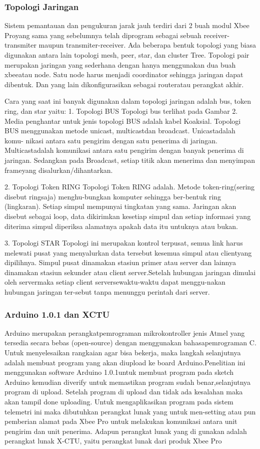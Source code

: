 \subsubsection{Topologi Jaringan}
Sistem pemantauan dan pengukuran jarak jauh terdiri dari 2 buah modul 
Xbee Proyang sama yang sebelumnya telah diprogram sebagai sebuah receiver-transmiter maupun transmiter-receiver. Ada beberapa bentuk topologi yang biasa digunakan antara lain topologi mesh, peer, star, dan cluster Tree.
Topologi pair merupakan jaringan yang sederhana dengan hanya menggunakan dua buah xbeeatau node. Satu node harus menjadi coordinator sehingga jaringan dapat dibentuk. Dan yang lain dikonfigurasikan sebagai routeratau perangkat akhir.

Cara yang saat ini banyak digunakan  dalam topologi jaringan adalah bus, token ring, dan star yaitu:
1. Topologi BUS 
Topologi bus terlihat pada Gambar 2. Media penghantar untuk jenis topologi BUS adalah kabel Koaksial. Topologi BUS menggunakan metode unicast, multicastdan broadcast. Unicastadalah komu- nikasi antara satu pengirim 
dengan satu penerima di jaringan. Multicastadalah komunikasi antara satu pengirim dengan banyak penerima di jaringan. Sedangkan pada Broadcast, setiap titik akan menerima dan menyimpan frameyang disalurkan/dihantarkan.

2. Topologi Token RING 
Topologi Token RING adalah. Metode token-ring(sering disebut ringsaja) menghu-bungkan komputer sehingga ber-bentuk ring (lingkaran). Setiap 
simpul mempunyai tingkatan yang sama. Jaringan akan disebut sebagai loop, data dikirimkan kesetiap simpul dan setiap informasi yang diterima simpul diperiksa alamatnya apakah data itu untuknya atau bukan.

3. Topologi STAR 
Topologi ini merupakan kontrol terpusat, semua link harus melewati pusat yang menyalurkan data tersebut kesemua simpul atau clientyang dipilihnya. Simpul pusat dinamakan stasiun primer atau 
server dan lainnya dinamakan 
stasiun sekunder atau client server.Setelah hubungan jaringan dimulai oleh servermaka setiap client serversewaktu-waktu dapat menggu-nakan hubungan jaringan ter-sebut tanpa menunggu perintah dari server.

\subsubsection {Arduino 1.0.1 dan XCTU}
Arduino merupakan perangkatpemrograman mikrokontroller jenis Atmel yang tersedia secara bebas (open-source)
dengan menggunakan bahasapemrograman C. Untuk menyelesaikan rangkaian agar bisa bekerja, maka langkah selanjutnya adalah membuat program yang
akan diupload ke board Arduino.Penelitian ini menggunakan software Arduino 1.0.1untuk membuat program pada sketch Arduino kemudian diverify
untuk memastikan program sudah benar,selanjutnya program di upload. Setelah program di upload dan tidak ada kesalahan
maka akan tampil done uploading. Untuk mengaplikasikan program pada sistem telemetri ini maka dibutuhkan perangkat lunak yang untuk men-setting atau pun pemberian alamat pada Xbee Pro untuk melakukan komunikasi antara unit pengirim dan unit penerima. Adapun
perangkat lunak yang di gunakan adalah perangkat lunak X-CTU, yaitu perangkat lunak dari produk Xbee Pro


